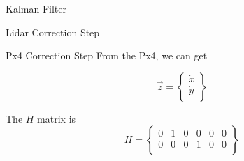 \documentclass[12pt]{article}
\begin{document}
\begin{section}{Kalman Filter}
\begin{subsection}{Lidar Correction Step}
\end{subsection}

\begin{subsection}{Px4 Correction Step}
From the Px4, we can get

\begin{equation}
\vec{z} = \begin{Bmatrix}
\dot{x}\\
\dot{y}\\
\end{Bmatrix}
\end{equation}

The $H$ matrix is
\begin{equation}
H = \begin{Bmatrix}
0 & 1 & 0 & 0 & 0 & 0\\
0 & 0 & 0 & 1 & 0 & 0\\
\end{Bmatrix}
\end{equation}
\end{subsection}

\end{section}
\end{document}
